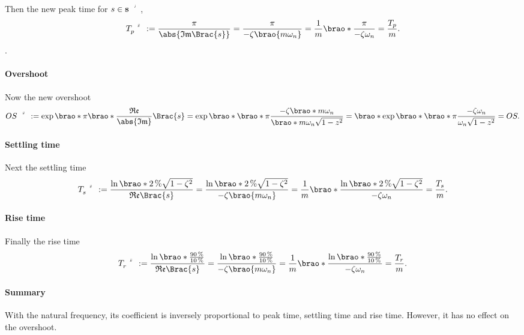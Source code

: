 \documentclass[11pt]{article}
\begin{document}
\begin{adjustwidth}{0.5in}{0in}
        Then the new peak time for \(s \in \setprime{\mathbf{s}}\),
        \[
            \setprime[2]{T}_p
            := \frac\pi{\abs{\mathfrak{Im}\Brac{s}}}
            = \frac\pi{-\zeta\brao{m\omega_n}}
            = \frac1m \brao*{\frac\pi{-\zeta\omega_n}}
            = \frac{T_p}m.
        \].

        \paragraph{Overshoot}
        Now the new overshoot
        \[
                \setprime[2]{OS}
                := \exp\brao*{\pi\brao*{\frac{\mathfrak{Re}}{\abs{\mathfrak{Im}}}}\Brac{s}}
                = \exp\brao*{\brao*\pi\frac
                    {-\zeta\brao*{m\omega_n}}
                    {\brao*{m\omega_n} \sqrt{1 - z^2}}
                }
                = \brao*{\exp\brao*{\brao*\pi\frac
                    {-\zeta\omega_n}
                    {\omega_n \sqrt{1 - z^2}}
                }}
                = OS.
        \]

        \paragraph{Settling time}
        Next the settling time
        \[
            \setprime[2]{T}_s
            := \frac{\ln\brao*{\SI2\percent \sqrt{1 - \zeta^2}}}{\mathfrak{Re}\Brac{s}}
            = \frac{\ln\brao*{\SI2\percent \sqrt{1 - \zeta^2}}}{-\zeta\brao{m\omega_n}}
            = \frac1m\brao*{\frac{\ln\brao*{\SI2\percent \sqrt{1 - \zeta^2}}}{-\zeta\omega_n}}
            = \frac{T_s}m.
        \]

        \paragraph{Rise time}
        Finally the rise time
        \[
            \setprime[2]T_r
            := \frac{\ln\brao*{\frac
                {\SI{90}\percent}
                {\SI{10}\percent}
            }}{\mathfrak{Re}\Brac{s}}
            = \frac{\ln\brao*{\frac
                {\SI{90}\percent}
                {\SI{10}\percent}
            }}{-\zeta\brao{m\omega_n}}
            = \frac1m\brao*{
                \frac{\ln\brao*{\frac
                    {\SI{90}\percent}
                    {\SI{10}\percent}
                }}{-\zeta\omega_n}
            }
            = \frac{T_r}m.
        \]

        \paragraph{Summary}
        With the natural frequency, its coefficient is inversely proportional to peak time, settling time and rise time. However, it has no effect on the overshoot.


\end{adjustwidth}
\end{document}
